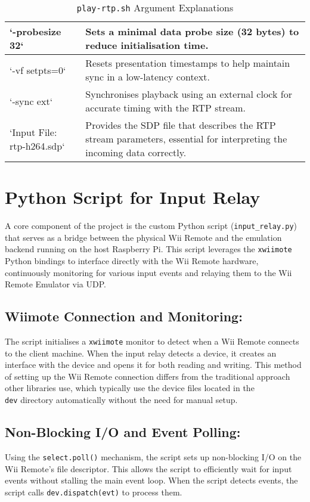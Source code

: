 \begin{table}[!ht]
\begin{tabular}{|p{5cm}|p{10cm}|}
		`-probesize 32`                     & Sets a minimal data probe size (32 bytes) to reduce initialisation time.                                                \\ \hline
		`-vf setpts=0`                      & Resets presentation timestamps to help maintain sync in a low-latency context.                                          \\ \hline
		`-sync ext`                         & Synchronises playback using an external clock for accurate timing with the RTP stream.                                  \\ \hline
		`Input File: rtp-h264.sdp`          & Provides the SDP file that describes the RTP stream parameters, essential for interpreting the incoming data correctly. \\ \hline
	\end{tabular}
	\caption{\texttt{play-rtp.sh} Argument Explanations}
	\label{tab:play-args}

\end{table}




\section{Python Script for Input Relay}
A core component of the project is the custom Python script
(\texttt{input\_relay.py}) that serves as a bridge between the physical
Wii Remote and the emulation backend running on the host Raspberry Pi. This
script leverages the \texttt{xwiimote} Python bindings to interface directly
with the Wii Remote hardware, continuously monitoring for various input events
and relaying them to the Wii Remote Emulator via UDP.

\subsection{Wiimote Connection and Monitoring:}
The script initialises a \texttt{xwiimote} monitor to detect when a Wii Remote connects to the client machine. When the input relay detects a device, it creates an interface with the device and opens it for both reading and writing. This method of setting up the Wii Remote connection differs from the traditional approach other libraries use, which typically use the device files located in the \texttt{\\dev} directory automatically without the need for manual setup.

\subsection{Non-Blocking I/O and Event Polling:}
Using the \texttt{select.poll()} mechanism, the script sets up non-blocking I/O on the Wii Remote’s file descriptor. This allows the script to efficiently wait for input events without stalling the main event loop. When the script detects events, the script calls \texttt{dev.dispatch(evt)} to process them.

